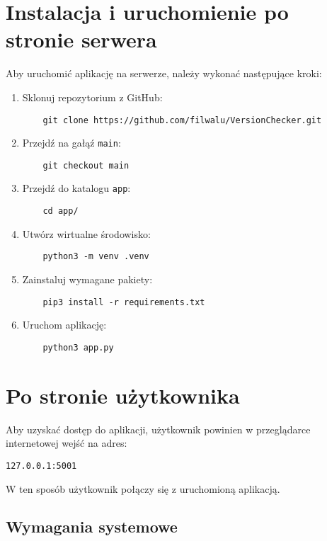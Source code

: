 \section{Instalacja i uruchomienie po stronie serwera}

Aby uruchomić aplikację na serwerze, należy wykonać następujące kroki:

\begin{enumerate}
    \item Sklonuj repozytorium z GitHub:
    \begin{verbatim}
    git clone https://github.com/filwalu/VersionChecker.git
    \end{verbatim}
    \item Przejdź na gałąź \texttt{main}:
    \begin{verbatim}
    git checkout main
    \end{verbatim}
    \item Przejdź do katalogu \texttt{app}:
    \begin{verbatim}
    cd app/
    \end{verbatim}
    \item Utwórz wirtualne środowisko:
    \begin{verbatim}
    python3 -m venv .venv
    \end{verbatim}
    \item Zainstaluj wymagane pakiety:
    \begin{verbatim}
    pip3 install -r requirements.txt
    \end{verbatim}
    \item Uruchom aplikację:
    \begin{verbatim}
    python3 app.py
    \end{verbatim}
\end{enumerate}

\section{Po stronie użytkownika}

Aby uzyskać dostęp do aplikacji, użytkownik powinien w przeglądarce internetowej wejść na adres:

\begin{verbatim}
127.0.0.1:5001
\end{verbatim}

\noindent W ten sposób użytkownik połączy się z uruchomioną aplikacją.


\subsection{Wymagania systemowe}

